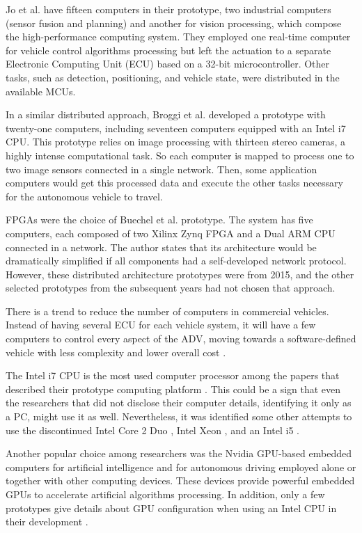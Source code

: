 \documentclass[lettersize,journal]{IEEEtran}
\begin{document}
Jo et al. \cite{Jo2015} have fifteen computers in their prototype, two industrial computers (sensor fusion and planning) and another for vision processing, which compose the high-performance computing system. They employed one real-time computer for vehicle control algorithms processing but left the actuation to a separate Electronic Computing Unit (ECU) based on a 32-bit microcontroller. Other tasks, such as detection, positioning, and vehicle state, were distributed in the available MCUs.

In a similar distributed approach, Broggi et al. \cite{Broggi2015} developed a prototype with twenty-one computers, including seventeen computers equipped with an Intel i7 CPU. This prototype relies on image processing with thirteen stereo cameras, a highly intense computational task. So each computer is mapped to process one to two image sensors connected in a single network. Then, some application computers would get this processed data and execute the other tasks necessary for the autonomous vehicle to travel.

FPGAs were the choice of Buechel et al. \cite{Buechel2015} prototype. The system has five computers, each composed of two Xilinx Zynq FPGA and a Dual ARM CPU connected in a network. The author states that its architecture would be dramatically simplified if all components had a self-developed network protocol. However, these distributed architecture prototypes were from 2015, and the other selected prototypes from the subsequent years had not chosen that approach.

There is a trend to reduce the number of computers in commercial vehicles. Instead of having several ECU for each vehicle system, it will have a few computers to control every aspect of the ADV, moving towards a software-defined vehicle with less complexity and lower overall cost \cite{Aptiv}.

The Intel i7 CPU is the most used computer processor among the papers that described their prototype computing platform \cite{Kunz2015,Kato2015,Broggi2015,Buechel2015,Martin2016,Zong2018,Kessler2019,Betz2019,Marin-Plaza2019,Reke2020}.
This could be a sign that even the researchers that did not disclose their computer details, identifying it only as a PC, might use it as well. Nevertheless, it was identified some other attempts to use the discontinued Intel Core 2 Duo \cite{Jo2015} \cite{Broggi2015a}, Intel Xeon \cite{Tas2018a}, and an Intel i5 \cite{Aramrattana2018}.
 
 Another popular choice among researchers was the Nvidia GPU-based embedded computers for artificial intelligence \cite{Tang2018}
\cite{Buyval2019}
 and for autonomous driving \cite{Bojarski2016,Belcarz2018,Kessler2019,Betz2019}
employed alone or together with other computing devices. These devices provide powerful embedded GPUs to accelerate artificial algorithms processing. In addition, only a few prototypes give details about GPU configuration when using an Intel CPU in their development \cite{Kato2015,Tas2018a,Buyval2019,Angel2020}.
\end{document}
